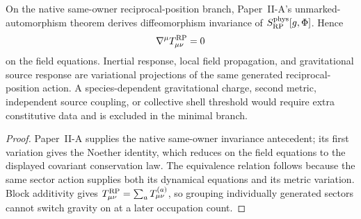\documentclass[12pt,a4paper]{article}
\begin{document}
\begin{corollary}
\label{p8:cor:reciprocal-position-source-conservation}
On the native same-owner reciprocal-position branch, Paper~II-A's
unmarked-automorphism theorem derives diffeomorphism invariance of
\(S_{\rm RP}^{\rm phys}[g,\Phi]\).  Hence
\[
    \nabla^\mu T^{\rm RP}_{\mu\nu}=0
\]
on the field equations.  Inertial response, local field propagation, and gravitational source response
are variational projections of the same generated reciprocal-position action.
A species-dependent gravitational charge, second metric, independent source
coupling, or collective shell threshold would require extra constitutive data
and is excluded in the minimal branch.
\end{corollary}

\begin{proof}
Paper~II-A supplies the native same-owner invariance antecedent; its first
variation gives the Noether identity, which reduces on the field equations to
the displayed covariant conservation law.  The equivalence relation follows because the same sector action
supplies both its dynamical equations and its metric variation.  Block
additivity gives
\(T^{\rm RP}_{\mu\nu}=\sum_aT^{(a)}_{\mu\nu}\), so grouping individually
generated sectors cannot switch gravity on at a later occupation count.
\end{proof}
\end{document}
